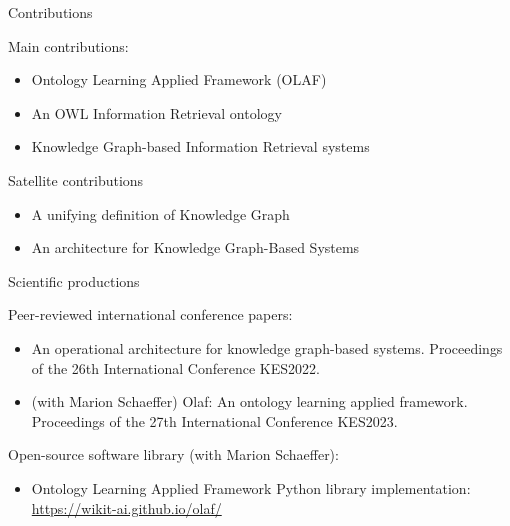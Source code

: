 


\begin{frame}{Contributions}


    Main contributions:
    \begin{itemize}
        \item Ontology Learning Applied Framework (OLAF)
        \item An OWL Information Retrieval ontology
        \item Knowledge Graph-based Information Retrieval systems
    \end{itemize}

    Satellite contributions
    \begin{itemize}
        \item A unifying definition of Knowledge Graph
        \item An architecture for Knowledge Graph-Based Systems
    \end{itemize}
    
\end{frame}

\begin{frame}{Scientific productions}

    Peer-reviewed international conference papers:
    \begin{itemize}
        \item An operational architecture for knowledge graph-based systems. Proceedings of the 26th International Conference KES2022.
        \item (with Marion Schaeffer) Olaf: An ontology learning applied framework. Proceedings of the 27th International Conference KES2023.
    \end{itemize}

    Open-source software library (with Marion Schaeffer):
    \begin{itemize}
        \item Ontology Learning Applied Framework Python library implementation:\\\href{https://wikit-ai.github.io/olaf/}{https://wikit-ai.github.io/olaf/}
    \end{itemize}

\end{frame}